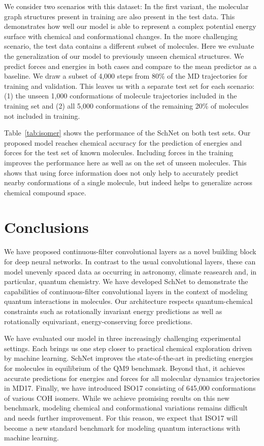 \documentclass{article}
\begin{document}
We consider two scenarios with this dataset:
In the first variant, the molecular graph structures present in training are also present in the test data.
This demonstrates how well our model is able to represent a complex potential energy surface with chemical and conformational changes.
In the more challenging scenario, the test data contains a different subset of molecules. 
Here we evaluate the generalization of our model to previously unseen chemical structures.
We predict forces and energies in both cases and compare to the mean predictor as a baseline.
We draw a subset of 4,000 steps from 80\% of the MD trajectories for training and validation.
This leaves us with a separate test set for each scenario: 
(1) the unseen 1,000 conformations of molecule trajectories included in the training set and
(2) all 5,000 conformations of the remaining 20\% of molecules not included in training.

Table~\ref{tab:isomer} shows the performance of the SchNet on both test sets.
Our proposed model reaches chemical accuracy for the prediction of energies and forces for the test set of known molecules.
Including forces in the training improves the performance here as well as on the set of unseen molecules.
This shows that using force information does not only help to accurately predict nearby conformations of a single molecule, but indeed helps to generalize across chemical compound space.

\section{Conclusions}
We have proposed continuous-filter convolutional layers as a novel building block for deep neural networks.
In contrast to the usual convolutional layers, these can model unevenly spaced data as occurring in astronomy, climate reasearch and, in particular, quantum chemistry.
We have developed SchNet to demonstrate the capabilities of continuous-filter convolutional layers in the context of modeling quantum interactions in molecules.
Our architecture respects quantum-chemical constraints such as rotationally invariant energy predictions as well as rotationally equivariant, energy-conserving force predictions.

We have evaluated our model in three increasingly challenging experimental settings.
Each brings us one step closer to practical chemical exploration driven by machine learning.
SchNet improves the state-of-the-art in predicting energies for molecules in equilibrium of the QM9 benchmark.
Beyond that, it achieves accurate predictions for energies and forces for all molecular dynamics trajectories in MD17.
Finally, we have introduced ISO17 consisting of 645,000 conformations of various COH isomers.
While we achieve promising results on this new benchmark, modeling chemical and conformational variations remains difficult and needs further improvement.
For this reason, we expect that ISO17 will become a new standard benchmark for modeling quantum interactions with machine learning.
\end{document}
